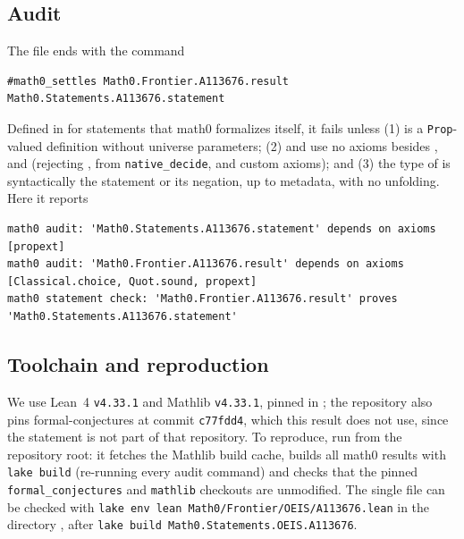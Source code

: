 \documentclass[11pt]{amsart}
\theoremstyle{plain}
\theoremstyle{definition}
\begin{document}
\subsection*{Audit}
The file ends with the command
\begin{lstlisting}
#math0_settles Math0.Frontier.A113676.result Math0.Statements.A113676.statement
\end{lstlisting}
Defined in  for statements that math0 formalizes itself, it fails unless (1)  is a \texttt{Prop}-valued definition without universe parameters; (2)  and  use no axioms besides ,  and  (rejecting ,  from \texttt{native\_decide}, and custom axioms); and (3) the type of  is syntactically the statement or its negation, up to metadata, with no unfolding. Here it reports
\begin{lstlisting}[basicstyle=\ttfamily\scriptsize]
math0 audit: 'Math0.Statements.A113676.statement' depends on axioms [propext]
math0 audit: 'Math0.Frontier.A113676.result' depends on axioms [Classical.choice, Quot.sound, propext]
math0 statement check: 'Math0.Frontier.A113676.result' proves 'Math0.Statements.A113676.statement'
\end{lstlisting}

\subsection*{Toolchain and reproduction}
We use Lean~4 \cite{Lean4} \texttt{v4.33.1} and Mathlib \cite{Mathlib} \texttt{v4.33.1}, pinned in ; the repository also pins formal-conjectures \cite{FC} at commit \texttt{c77fdd4}, which this result does not use, since the statement is not part of that repository.
To reproduce, run  from the repository root: it fetches the Mathlib build cache, builds all math0 results with \texttt{lake build} (re-running every audit command) and checks that the pinned \texttt{formal\_conjectures} and \texttt{mathlib} checkouts are unmodified. The single file can be checked with \texttt{lake env lean Math0/Frontier/OEIS/A113676.lean} in the directory , after \texttt{lake build Math0.Statements.OEIS.A113676}.
\end{document}
